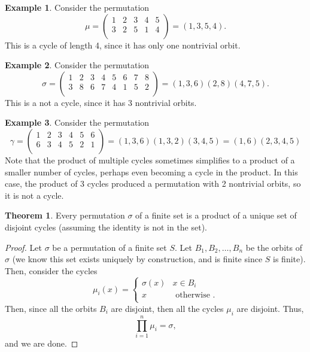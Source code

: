 \documentclass[a5paper]{article}
\theoremstyle{definition}%
\newtheorem*{theorem*}{Theorem} %
\newtheorem*{example*}{Example}
\numberwithin{exercise}{section}
\theoremstyle{remark}%
\begin{document}
\begin{example*}
Consider the permutation 
\[\mu = 
\left(\begin{array}{ccccc}
	1 & 2 & 3 & 4 & 5 \\
	3 & 2 & 5 & 1 & 4 \\
\end{array}\right)
=
(1,3,5,4).
\]
This is a cycle of length 4, since it has only one nontrivial orbit. 
\end{example*}

\begin{example*}
Consider the permutation 
\[\sigma = 
\left(\begin{array}{cccccccc}
	1 & 2 & 3 & 4 & 5 & 6 & 7 & 8 \\
	3 & 8 & 6 & 7 & 4 & 1 & 5 & 2 \\
\end{array}\right)
=
(1,3,6)(2,8)(4,7,5).
\]
This is a not a cycle, since it has 3 nontrivial orbits.
\end{example*}

\begin{example*}
Consider the permutation 
\[\gamma = 
\left(\begin{array}{cccccc}
	1 & 2 & 3 & 4 & 5 & 6 \\
	6 & 3 & 4 & 5 & 2 & 1 \\
\end{array}\right)
=
(1,3,6)(1,3,2)(3,4,5)
=
(1,6)(2,3,4,5)
\]
Note that the product of multiple cycles sometimes simplifies to a product of a smaller number of cycles, perhaps even becoming a cycle in the product. In this case, the product of 3 cycles produced a permutation with 2 nontrivial orbits, so it is not a cycle. 
\end{example*}

\begin{highlight}
\begin{theorem*}
Every permutation $\sigma$ of a finite set is a product of a unique set of disjoint cycles (assuming the identity is not in the set). 
\end{theorem*}
\end{highlight}
\begin{proof}
Let $\sigma$ be a permutation of a finite set $S$. Let $B_1, B_2, \dots, B_n$ be the orbits of $\sigma$ (we know this set exists uniquely by construction, and is finite since $S$ is finite). Then, consider the cycles 
\[\mu_i(x)=
\begin{cases}
\sigma(x) & x\in B_i\\
x & \text{ otherwise }.\\
\end{cases}\]
Then, since all the orbits $B_i$ are disjoint, then all the cycles $\mu_i$ are disjoint. Thus, $$\prod_{i=1}^n\mu_i=\sigma,$$ and we are done. 
\end{proof}
\end{document}

